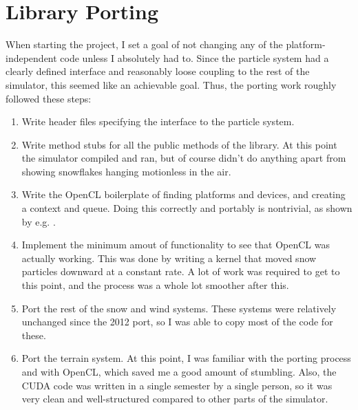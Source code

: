 \section{Library Porting}
When starting the project, I set a goal of not changing any of the platform-independent code unless I absolutely had to. Since the particle system had a clearly defined interface and reasonably loose coupling to the rest of the simulator, this seemed like an achievable goal. Thus, the porting work roughly followed these steps:
\begin{enumerate}
\item Write header files specifying the interface to the particle system.
\item Write method stubs for all the public methods of the library. At this point the simulator compiled and ran, but of course didn’t do anything apart from showing snowflakes hanging motionless in the air.
\item Write the OpenCL boilerplate of finding platforms and devices, and creating a context and queue. Doing this correctly and portably is nontrivial, as shown by e.g. \citet{fastkor2012boilerplate}.
\item Implement the minimum amout of functionality to see that OpenCL was actually working. This was done by writing a kernel that moved snow particles downward at a constant rate. A lot of work was required to get to this point, and the process was a whole lot smoother after this. 
\item Port the rest of the snow and wind systems. These systems were relatively unchanged since the 2012 port, so I was able to copy most of the code for these.
\item Port the terrain system. At this point, I was familiar with the porting process and with OpenCL, which saved me a good amount of stumbling. Also, the CUDA code was written in a single semester by a single person, so it was very clean and well-structured compared to other parts of the simulator.
\end{enumerate}